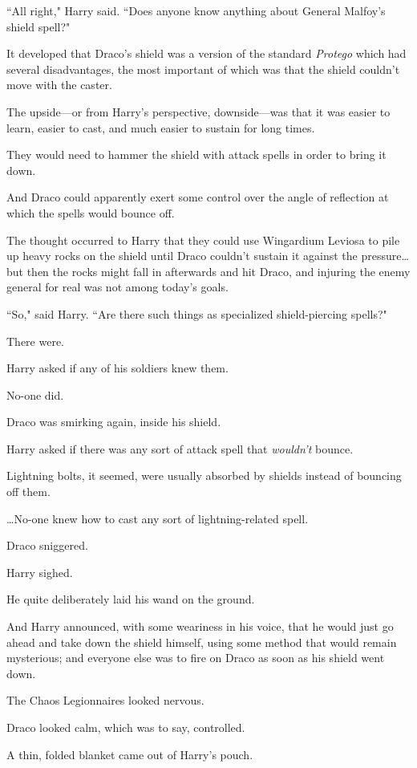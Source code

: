 ``All right," Harry said. ``Does anyone know anything about General Malfoy's shield spell?"

It developed that Draco's shield was a version of the standard \emph{Protego} which had several disadvantages, the most important of which was that the shield couldn't move with the caster.

The upside—or from Harry's perspective, downside—was that it was easier to learn, easier to cast, and much easier to sustain for long times.

They would need to hammer the shield with attack spells in order to bring it down.

And Draco could apparently exert some control over the angle of reflection at which the spells would bounce off.

The thought occurred to Harry that they could use Wingardium Leviosa to pile up heavy rocks on the shield until Draco couldn't sustain it against the pressure{\ldots} but then the rocks might fall in afterwards and hit Draco, and injuring the enemy general for real was not among today's goals.

``So," said Harry. ``Are there such things as specialized shield-piercing spells?"

There were.

Harry asked if any of his soldiers knew them.

No-one did.

Draco was smirking again, inside his shield.

Harry asked if there was any sort of attack spell that \emph{wouldn't} bounce.

Lightning bolts, it seemed, were usually absorbed by shields instead of bouncing off them.

{\ldots}No-one knew how to cast any sort of lightning-related spell.

Draco sniggered.

Harry sighed.

He quite deliberately laid his wand on the ground.

And Harry announced, with some weariness in his voice, that he would just go ahead and take down the shield himself, using some method that would remain mysterious; and everyone else was to fire on Draco as soon as his shield went down.

The Chaos Legionnaires looked nervous.

Draco looked calm, which was to say, controlled.

A thin, folded blanket came out of Harry's pouch.

